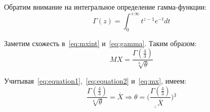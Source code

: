 Обратим внимание на интегральное определение гамма-функции:
\begin{equation} \label{eq:gamma}
    \Gamma(z) = \int^{+\infty}_0 t^{z - 1} e^{-t} dt
\end{equation}

Заметим схожесть в~\ref{eq:mxint} и~\ref{eq:gamma}. Таким образом:
\begin{equation} \label{eq:mx}
    MX = \frac{\Gamma(\frac{4}{3})}{\sqrt[3]{\theta}}
\end{equation}

Учитывая~\ref{eq:equation1},~\ref{eq:equation2} и~\ref{eq:mx}, имеем:
\begin{equation*}
    \frac{\Gamma(\frac{4}{3})}{\sqrt[4]{\theta}} = \overline{X} \Rightarrow
    \underline{\underline{\theta = \Big(\frac{\Gamma(\frac{4}{3})}{\overline{X}}\Big){}^3}}
\end{equation*}

